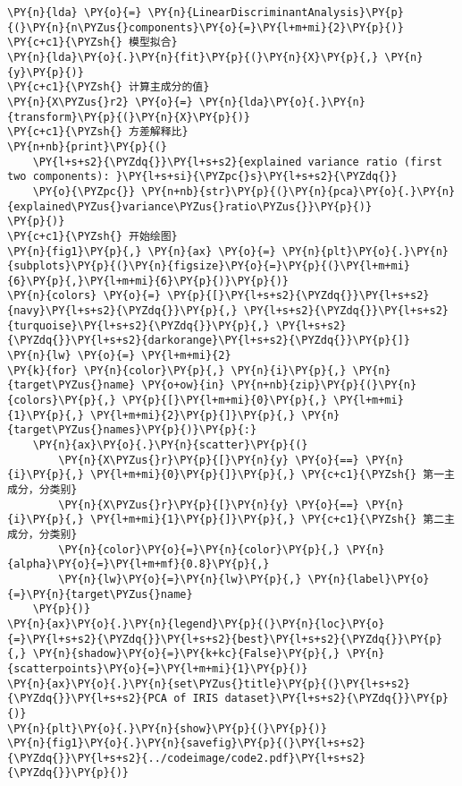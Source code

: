\begin{Verbatim}[commandchars=\\\{\}]
\PY{n}{lda} \PY{o}{=} \PY{n}{LinearDiscriminantAnalysis}\PY{p}{(}\PY{n}{n\PYZus{}components}\PY{o}{=}\PY{l+m+mi}{2}\PY{p}{)}
\PY{c+c1}{\PYZsh{} 模型拟合}
\PY{n}{lda}\PY{o}{.}\PY{n}{fit}\PY{p}{(}\PY{n}{X}\PY{p}{,} \PY{n}{y}\PY{p}{)}
\PY{c+c1}{\PYZsh{} 计算主成分的值}
\PY{n}{X\PYZus{}r2} \PY{o}{=} \PY{n}{lda}\PY{o}{.}\PY{n}{transform}\PY{p}{(}\PY{n}{X}\PY{p}{)}
\PY{c+c1}{\PYZsh{} 方差解释比}
\PY{n+nb}{print}\PY{p}{(}
    \PY{l+s+s2}{\PYZdq{}}\PY{l+s+s2}{explained variance ratio (first two components): }\PY{l+s+si}{\PYZpc{}s}\PY{l+s+s2}{\PYZdq{}}
    \PY{o}{\PYZpc{}} \PY{n+nb}{str}\PY{p}{(}\PY{n}{pca}\PY{o}{.}\PY{n}{explained\PYZus{}variance\PYZus{}ratio\PYZus{}}\PY{p}{)}
\PY{p}{)}
\PY{c+c1}{\PYZsh{} 开始绘图}
\PY{n}{fig1}\PY{p}{,} \PY{n}{ax} \PY{o}{=} \PY{n}{plt}\PY{o}{.}\PY{n}{subplots}\PY{p}{(}\PY{n}{figsize}\PY{o}{=}\PY{p}{(}\PY{l+m+mi}{6}\PY{p}{,}\PY{l+m+mi}{6}\PY{p}{)}\PY{p}{)}
\PY{n}{colors} \PY{o}{=} \PY{p}{[}\PY{l+s+s2}{\PYZdq{}}\PY{l+s+s2}{navy}\PY{l+s+s2}{\PYZdq{}}\PY{p}{,} \PY{l+s+s2}{\PYZdq{}}\PY{l+s+s2}{turquoise}\PY{l+s+s2}{\PYZdq{}}\PY{p}{,} \PY{l+s+s2}{\PYZdq{}}\PY{l+s+s2}{darkorange}\PY{l+s+s2}{\PYZdq{}}\PY{p}{]}
\PY{n}{lw} \PY{o}{=} \PY{l+m+mi}{2}
\PY{k}{for} \PY{n}{color}\PY{p}{,} \PY{n}{i}\PY{p}{,} \PY{n}{target\PYZus{}name} \PY{o+ow}{in} \PY{n+nb}{zip}\PY{p}{(}\PY{n}{colors}\PY{p}{,} \PY{p}{[}\PY{l+m+mi}{0}\PY{p}{,} \PY{l+m+mi}{1}\PY{p}{,} \PY{l+m+mi}{2}\PY{p}{]}\PY{p}{,} \PY{n}{target\PYZus{}names}\PY{p}{)}\PY{p}{:}
    \PY{n}{ax}\PY{o}{.}\PY{n}{scatter}\PY{p}{(}
        \PY{n}{X\PYZus{}r}\PY{p}{[}\PY{n}{y} \PY{o}{==} \PY{n}{i}\PY{p}{,} \PY{l+m+mi}{0}\PY{p}{]}\PY{p}{,} \PY{c+c1}{\PYZsh{} 第一主成分，分类别}
        \PY{n}{X\PYZus{}r}\PY{p}{[}\PY{n}{y} \PY{o}{==} \PY{n}{i}\PY{p}{,} \PY{l+m+mi}{1}\PY{p}{]}\PY{p}{,} \PY{c+c1}{\PYZsh{} 第二主成分，分类别}
        \PY{n}{color}\PY{o}{=}\PY{n}{color}\PY{p}{,} \PY{n}{alpha}\PY{o}{=}\PY{l+m+mf}{0.8}\PY{p}{,} 
        \PY{n}{lw}\PY{o}{=}\PY{n}{lw}\PY{p}{,} \PY{n}{label}\PY{o}{=}\PY{n}{target\PYZus{}name}
    \PY{p}{)}
\PY{n}{ax}\PY{o}{.}\PY{n}{legend}\PY{p}{(}\PY{n}{loc}\PY{o}{=}\PY{l+s+s2}{\PYZdq{}}\PY{l+s+s2}{best}\PY{l+s+s2}{\PYZdq{}}\PY{p}{,} \PY{n}{shadow}\PY{o}{=}\PY{k+kc}{False}\PY{p}{,} \PY{n}{scatterpoints}\PY{o}{=}\PY{l+m+mi}{1}\PY{p}{)}
\PY{n}{ax}\PY{o}{.}\PY{n}{set\PYZus{}title}\PY{p}{(}\PY{l+s+s2}{\PYZdq{}}\PY{l+s+s2}{PCA of IRIS dataset}\PY{l+s+s2}{\PYZdq{}}\PY{p}{)}
\PY{n}{plt}\PY{o}{.}\PY{n}{show}\PY{p}{(}\PY{p}{)}
\PY{n}{fig1}\PY{o}{.}\PY{n}{savefig}\PY{p}{(}\PY{l+s+s2}{\PYZdq{}}\PY{l+s+s2}{../codeimage/code2.pdf}\PY{l+s+s2}{\PYZdq{}}\PY{p}{)}


\end{Verbatim}
